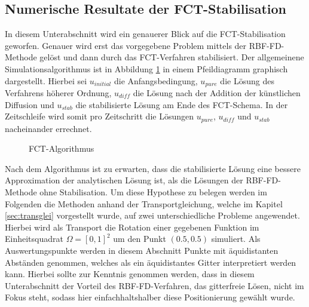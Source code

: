 \documentclass[12pt,titlepage]{article}
\begin{document}
\subsection{Numerische Resultate der FCT-Stabilisation}
In diesem Unterabschnitt wird ein genauerer Blick auf die FCT-Stabilisation geworfen. Genauer wird erst das vorgegebene Problem mittels der RBF-FD-Methode gelöst und dann durch das FCT-Verfahren stabilisiert. Der allgemeinene Simulationsalgorithmus ist in Abbildung \ref{fig:algorithmus} in einem Pfeildiagramm graphisch dargestellt. Hierbei sei $u_{initial}$  die Anfangsbedingung, $u_{pure}$ die Lösung des Verfahrens höherer Ordnung, $u_{diff}$ die Lösung nach der Addition der künstlichen Diffusion und $u_{stab}$ die stabilisierte Lösung am Ende des FCT-Schema. In der Zeitschleife wird somit pro Zeitschritt die Lösungen $u_{pure}$, $u_{diff}$ und $u_{stab}$ nacheinander errechnet.
\begin{figure}[H]
\centering
\caption{FCT-Algorithmus}
\label{fig:algorithmus}
\end{figure}
\noindent
Nach dem Algorithmus ist zu erwarten, dass die stabilisierte Lösung eine bessere Approximation der analytischen Lösung ist, als die Lösungen der RBF-FD-Methode ohne Stabilisation. Um diese Hypothese zu belegen werden im Folgenden die Methoden anhand der Transportgleichung, welche im Kapitel \ref{sec:transglei} vorgestellt wurde,  auf zwei unterschiedliche Probleme angewendet. Hierbei wird als Transport die Rotation einer gegebenen Funktion im Einheitsquadrat $\Omega=[0,1]^2$ um den Punkt $(0.5,0.5)$ simuliert. Als Auswertungspunkte werden in diesem Abschnitt Punkte mit äquidistanten Abständen genommen, welches als ein äquidistantes Gitter interpretiert werden kann. Hierbei sollte zur Kenntnis genommen werden, dass in diesem Unterabschnitt der Vorteil des RBF-FD-Verfahren, das gitterfreie Lösen, nicht im Fokus steht, sodass hier einfachhaltshalber diese Positionierung gewählt wurde.\\\\
\end{document}
